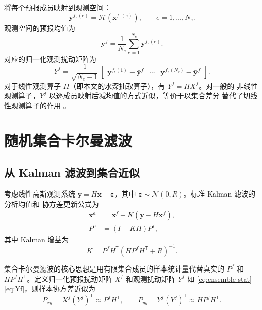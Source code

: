 \documentclass[12pt,a4paper]{article}
\newcommand{\x}{\bm{x}}
\newcommand{\y}{\bm{y}}
\newcommand{\T}{^{\mathsf T}}
\newcommand{\calH}{\mathcal{H}}
\begin{document}
将每个预报成员映射到观测空间：
\begin{equation}
  \y^{f,(e)} = \calH(\x^{f,(e)}), \qquad e = 1, \dots, N_e.
  \label{eq:obs-mapping}
\end{equation}
观测空间的预报均值为
\[
  \bar{\y}^f = \frac{1}{N_e}\sum_{e=1}^{N_e} \y^{f,(e)}.
\]
对应的归一化观测扰动矩阵为
\begin{equation}
  Y^f = \frac{1}{\sqrt{N_e - 1}}
  \begin{bmatrix}
    \y^{f,(1)} - \bar{\y}^f & \cdots & \y^{f,(N_e)} - \bar{\y}^f
  \end{bmatrix}.
  \label{eq:Yf}
\end{equation}
对于线性观测算子 $H$（即本文的水深抽取算子），有 $Y^f = H X^f$。对一般的
非线性观测算子，$Y^f$ 以逐成员映射后减均值的方式近似，等价于以集合差分
替代了切线性观测算子的作用 \cite{asch2016data}。

\section{随机集合卡尔曼滤波}
\label{sec:enkf}

\subsection{从 Kalman 滤波到集合近似}

考虑线性高斯观测系统 $\y = H\x + \bm{\varepsilon}$，其中
$\bm{\varepsilon} \sim \mathcal{N}(0, R)$。标准 Kalman 滤波的分析均值和
协方差更新公式为
\begin{align}
  \x^a &= \x^f + K(\y - H\x^f), \label{eq:kf-mean} \\
  P^a &= (I - KH)P^f, \label{eq:kf-cov}
\end{align}
其中 Kalman 增益为
\begin{equation}
  K = P^f H\T (H P^f H\T + R)^{-1}.
  \label{eq:kf-gain}
\end{equation}

集合卡尔曼滤波的核心思想是用有限集合成员的样本统计量代替真实的 $P^f$ 和
$H P^f H\T$。定义归一化预报扰动矩阵 $X^f$ 和观测扰动矩阵 $Y^f$ 如
\eqref{eq:ensemble-stat}--\eqref{eq:Yf}，则样本协方差近似为
\begin{equation}
  P_{xy} = X^f (Y^f)\T \approx P^f H\T,\qquad
  P_{yy} = Y^f (Y^f)\T \approx H P^f H\T.
  \label{eq:sample-cov}
\end{equation}
\end{document}

